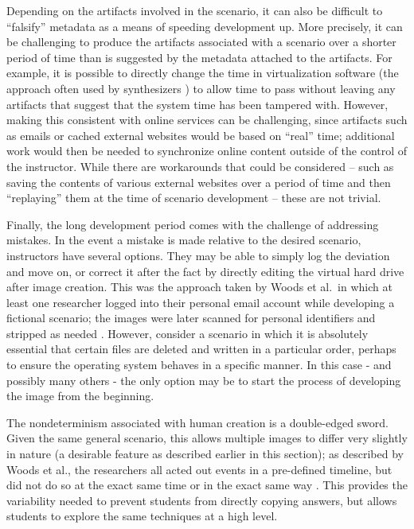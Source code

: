 Depending on the artifacts involved in the scenario, it can also be
difficult to ``falsify'' metadata as a means of speeding development up.
More precisely, it can be challenging to produce the artifacts
associated with a scenario over a shorter period of time than is
suggested by the metadata attached to the artifacts. For example, it is
possible to directly change the time in virtualization software (the
approach often used by synthesizers
\cite{gobelForTraceHolisticForensic2022,mochForensicImageGenerator2009})
to allow time to pass without leaving any artifacts that suggest that
the system time has been tampered with. However, making this consistent
with online services can be challenging, since artifacts such as emails
or cached external websites would be based on ``real'' time; additional
work would then be needed to synchronize online content outside of the
control of the instructor. While there are workarounds that could be
considered -- such as saving the contents of various external websites
over a period of time and then ``replaying'' them at the time of
scenario development -- these are not trivial.

Finally, the long development period comes with the challenge of
addressing mistakes. In the event a mistake is made relative to the
desired scenario, instructors have several options. They may be able to
simply log the deviation and move on, or correct it after the fact by
directly editing the virtual hard drive after image creation. This was
the approach taken by Woods et al.~in which at least one researcher
logged into their personal email account while developing a fictional
scenario; the images were later scanned for personal identifiers and
stripped as needed \cite{woodsCreatingRealisticCorpora2011}.
However, consider a scenario in which it is absolutely essential that
certain files are deleted and written in a particular order, perhaps to
ensure the operating system behaves in a specific manner. In this case -
and possibly many others - the only option may be to start the process
of developing the image from the beginning.

The nondeterminism associated with human creation is a double-edged
sword. Given the same general scenario, this allows multiple images to
differ very slightly in nature (a desirable feature as described earlier
in this section); as described by Woods et al., the researchers all
acted out events in a pre-defined timeline, but did not do so at the
exact same time or in the exact same way
\cite{woodsCreatingRealisticCorpora2011}. This provides the
variability needed to prevent students from directly copying answers,
but allows students to explore the same techniques at a high level.

